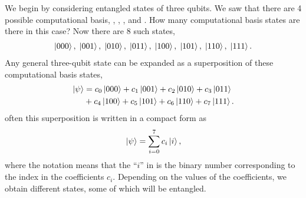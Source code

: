 We begin by considering entangled states of three qubits.
We saw that there are 4 possible computational basis, , , , and .
How many computational basis states are there in this case?
Now there are 8 such states,
\begin{align}
    \left| 000 \right\rangle, \; \left| 001 \right\rangle, \; \left| 010 \right\rangle, \; \left| 011 \right\rangle, \; \left| 100 \right\rangle, \; \left| 101 \right\rangle, \; \left| 110 \right\rangle, \; \left| 111 \right\rangle.
\end{align}
Any general three-qubit state can be expanded as a superposition of these computational basis states,
\begin{align}
    \left| \psi \right\rangle & = c_0\left| 000 \right\rangle + c_1\left| 001 \right\rangle + c_2\left| 010 \right\rangle + c_3\left| 011 \right\rangle \nonumber\\
    & + c_4\left| 100 \right\rangle + c_5\left| 101 \right\rangle + c_6\left| 110 \right\rangle + c_7\left| 111 \right\rangle.
\end{align}
often this superposition is written in a compact form as
\begin{equation}
    \left| \psi \right\rangle = \sum_{i=0}^7 c_i \left| i \right\rangle,
\end{equation}
where the notation means that the ``$i$'' in  is the binary number corresponding to the index in the coefficients $c_i$.
Depending on the values of the coefficients, we obtain different states, some of which will be entangled.

